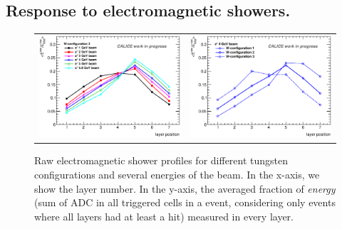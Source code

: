 \documentclass[a4paper,11pt]{article}
\begin{document}
\subsection{Response to electromagnetic showers.}

\begin{figure}[!t]
  \centering
  \begin{tabular}{ll}
    \includegraphics[width=2.6in]{figures/energy_z_profile_grid20_conf2.eps} & \includegraphics[width=2.6in]{figures/4GeV_energy_z_profile.eps} 
  \end{tabular}
  \caption{Raw electromagnetic shower profiles for different tungsten configurations and several energies of the beam. In the x-axis, we show the layer number. In the y-axis, the averaged fraction of {\it energy} (sum of ADC in all triggered cells in a event, considering only events where all layers had at least a hit) measured in every layer. }
\label{showers}
\end{figure}
\end{document}
